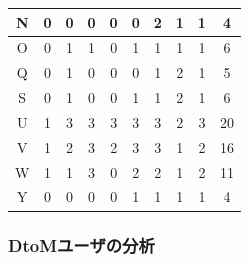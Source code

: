\documentclass[11pt,dvipdfmx]{jreport}
\begin{document}
\begin{table}[h]
\begin{minipage}[t]{0.55\linewidth}
\begin{tabular}{c|c|cccccccc}
N                   & 0                                           & \multicolumn{1}{c|}{0} & \multicolumn{1}{c|}{0} & \multicolumn{1}{c|}{0} & \multicolumn{1}{c|}{0} & \multicolumn{1}{c|}{2} & \multicolumn{1}{c|}{1} & \multicolumn{1}{c|}{1} & 4  \\ \hline
O                   & 0                                           & \multicolumn{1}{c|}{1} & \multicolumn{1}{c|}{1} & \multicolumn{1}{c|}{0} & \multicolumn{1}{c|}{1} & \multicolumn{1}{c|}{1} & \multicolumn{1}{c|}{1} & \multicolumn{1}{c|}{1} & 6  \\ \hline
Q                   & 0                                           & \multicolumn{1}{c|}{1} & \multicolumn{1}{c|}{0} & \multicolumn{1}{c|}{0} & \multicolumn{1}{c|}{0} & \multicolumn{1}{c|}{1} & \multicolumn{1}{c|}{2} & \multicolumn{1}{c|}{1} & 5  \\ \hline
S                   & 0                                           & \multicolumn{1}{c|}{1} & \multicolumn{1}{c|}{0} & \multicolumn{1}{c|}{0} & \multicolumn{1}{c|}{1} & \multicolumn{1}{c|}{1} & \multicolumn{1}{c|}{2} & \multicolumn{1}{c|}{1} & 6  \\ \hline
U                   & 1                                           & \multicolumn{1}{c|}{3} & \multicolumn{1}{c|}{3} & \multicolumn{1}{c|}{3} & \multicolumn{1}{c|}{3} & \multicolumn{1}{c|}{3} & \multicolumn{1}{c|}{2} & \multicolumn{1}{c|}{3} & 20 \\ \hline
V                   & 1                                           & \multicolumn{1}{c|}{2} & \multicolumn{1}{c|}{3} & \multicolumn{1}{c|}{2} & \multicolumn{1}{c|}{3} & \multicolumn{1}{c|}{3} & \multicolumn{1}{c|}{1} & \multicolumn{1}{c|}{2} & 16 \\ \hline
W                   & 1                                           & \multicolumn{1}{c|}{1} & \multicolumn{1}{c|}{3} & \multicolumn{1}{c|}{0} & \multicolumn{1}{c|}{2} & \multicolumn{1}{c|}{2} & \multicolumn{1}{c|}{1} & \multicolumn{1}{c|}{2} & 11 \\ \hline
Y                   & 0                                           & \multicolumn{1}{c|}{0} & \multicolumn{1}{c|}{0} & \multicolumn{1}{c|}{0} & \multicolumn{1}{c|}{1} & \multicolumn{1}{c|}{1} & \multicolumn{1}{c|}{1} & \multicolumn{1}{c|}{1} & 4  \\ \hline
\end{tabular}
  \end{minipage}
\end{table}

\subsubsection*{DtoMユーザの分析}
\end{document}
